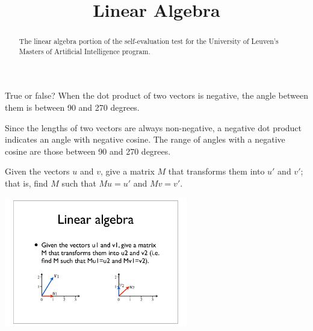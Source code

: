 \documentclass{ximera}
\title{Linear Algebra}
\begin{document}
\begin{abstract}
The linear algebra portion of the self-evaluation test for the
University of Leuven's Masters of Artificial Intelligence program.
\end{abstract}
\maketitle

\begin{question}
True or false?  When the dot product of two vectors is negative, the angle between them is between 90 and 270 degrees.
\begin{solution}
\begin{multiple-choice}
\end{multiple-choice}
\end{solution}
Since the lengths of two vectors are always non-negative, a negative dot product indicates an angle with negative cosine. The range of angles with a negative cosine are those between 90 and 270 degrees.
\end{question}

\begin{question}
Given the vectors $u$ and $v$, give a matrix $M$ that transforms them
into $u'$ and $v'$; that is, find $M$ such that $M u=u'$ and $M v=v'$.
\begin{image}
\includegraphics[width=0.6\textwidth]{fig.pdf}
\end{image}
\end{question}
\end{document}

